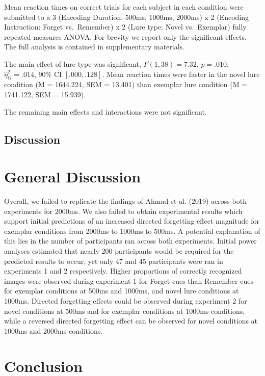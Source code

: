 \documentclass[
  english,
  man,floatsintext]{apa6}
\begin{document}
Mean reaction times on correct trials for each subject in each condition were submitted to a 3 (Encoding Duration: 500ms, 1000ms, 2000ms) x 2 (Encoding Instruction: Forget vs.~Remember) x 2 (Lure type: Novel vs.~Exemplar) fully repeated measures ANOVA. For brevity we report only the significant effects. The full analysis is contained in supplementary materials.

The main effect of lure type was significant, \(F(1, 38) = 7.32\), \(p = .010\), \(\hat{\eta}^2_G = .014\), 90\% CI \([.000, .128]\). Mean reaction times were faster in the novel lure condition (M = 1644.224, SEM = 13.401) than exemplar lure condition (M = 1741.122, SEM = 15.939).

The remaining main effects and interactions were not significant.

\hypertarget{discussion-1}{%
\subsection{Discussion}\label{discussion-1}}

\newpage

\hypertarget{general-discussion}{%
\section{General Discussion}\label{general-discussion}}

Overall, we failed to replicate the findings of Ahmad et al. (2019) across both experiments for 2000ms. We also failed to obtain experimental results which support initial predictions of an increased directed forgetting effect magnitude for exemplar conditions from 2000ms to 1000ms to 500ms. A potential explanation of this lies in the number of participants ran across both experiments. Initial power analyses estimated that nearly 200 participants would be required for the predicted results to occur, yet only 47 and 45 participants were ran in experiments 1 and 2 respectively. Higher proportions of correctly recognized images were observed during experiment 1 for Forget-cues than Remember-cues for exemplar conditions at 500ms and 1000ms, and novel lure conditions at 1000ms. Directed forgetting effects could be observed during experiment 2 for novel conditions at 500ms and for exemplar conditions at 1000ms conditions, while a reversed directed forgetting effect can be observed for novel conditions at 1000ms and 2000ms conditions.

\hypertarget{conclusion}{%
\section{Conclusion}\label{conclusion}}
\end{document}
